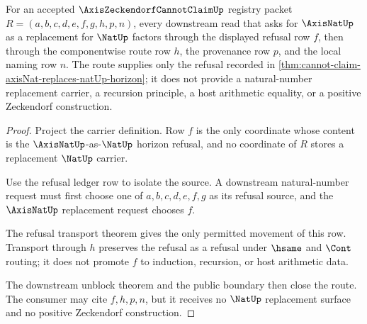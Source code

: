\begin{theorem}
\label{thm:axis-zeckendorf-cannot-claim-nat-refusal-route}
For an accepted $\AxisZeckendorfCannotClaimUp$ registry packet $R=(a,b,c,d,e,f,g,h,p,n)$, every downstream read that asks for $\AxisNatUp$ as a replacement for $\NatUp$ factors through the displayed refusal row $f$, then through the componentwise route row $h$, the provenance row $p$, and the local naming row $n$. The route supplies only the refusal recorded in \autoref{thm:cannot-claim-axisNat-replaces-natUp-horizon}; it does not provide a natural-number replacement carrier, a recursion principle, a host arithmetic equality, or a positive Zeckendorf construction.
\end{theorem}
\begin{proof}
Project the carrier definition. Row $f$ is the only coordinate whose content is the $\AxisNatUp$-as-$\NatUp$ horizon refusal, and no coordinate of $R$ stores a replacement $\NatUp$ carrier.

Use the refusal ledger row to isolate the source. A downstream natural-number request must first choose one of $a,b,c,d,e,f,g$ as its refusal source, and the $\AxisNatUp$ replacement request chooses $f$.

The refusal transport theorem gives the only permitted movement of this row. Transport through $h$ preserves the refusal as a refusal under $\hsame$ and $\Cont$ routing; it does not promote $f$ to induction, recursion, or host arithmetic data.

The downstream unblock theorem and the public boundary then close the route. The consumer may cite $f,h,p,n$, but it receives no $\NatUp$ replacement surface and no positive Zeckendorf construction.
\end{proof}

